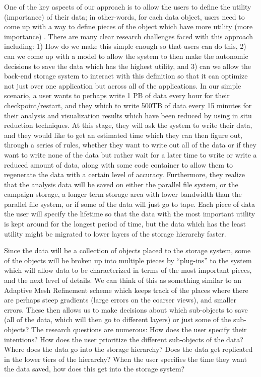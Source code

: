 One of the key aspects of our approach is to allow the users to define the utility (importance) of their data;
in other-words, for each data object, users need to come up with a way to define pieces of the object
which have more utility (more importance) . There are many clear research challenges faced with this approach 
including: 1) How do we make this simple enough so that users can do this, 2) can we come up with a model to
allow the system to then make the autonomic decisions to save the data which has the highest utility, and 3) can
we allow the back-end storage system to interact with this definition so that it can optimize not just over one application
but across all of the applications.
  In our simple scenario, a user
wants to perhaps write 1 PB of data every hour for their checkpoint/restart,
and they which to write 500TB of data every 15 minutes for their analysis
and visualization results which have been reduced by using in situ reduction
techniques. At this stage, they will ask the system to write their data, and
they would like to get an estimated time which they can then figure out,
through a series of rules, whether they want to write out all of the data or
if they want to write none of the data but rather wait for a later time to
write or write a reduced amount of data, along with some code container to
allow them to regenerate the data with a certain level of accuracy.
Furthermore, they realize that the analysis data will be saved on either the
parallel file system, or the campaign storage, a longer term storage area
with lower bandwidth than the parallel file system, or if some of the data
will just go to tape. Each piece of data the user will specify the lifetime so that the 
data with the most important utility is kept around for the longest period of time, but the data which has the least utility might
be migrated to lower layers of the storage hierarchy faster. 

Since the data will be a collection of objects placed to the storage system,
some of the objects will be broken up into multiple pieces by ``plug-ins''
to the system which will allow data to be characterized in terms of the most
important pieces, and the next level of details. We can think of this as
something similar to an Adaptive Mesh Refinement scheme which keeps track of
the places where there are perhaps steep gradients (large errors on the
coarser views), and smaller errors. These then allows us to make decisions
about which sub-objects to save (all of the data, which will then go to
different layers) or just some of the sub-objects? The research questions
are numerous: How does the user specify their intentions? How does the user
prioritize the different sub-objects of the data? Where does the data go
into the storage hierarchy? Does the data get replicated in the lower tiers
of the hierarchy? When the user specifies the time they want the data saved,
how does this get into the storage system?

